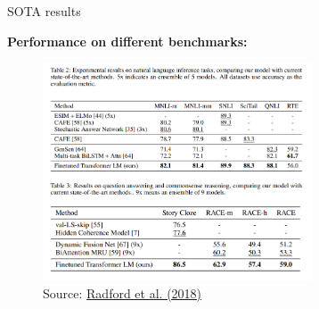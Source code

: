 
\begin{vbframe}{SOTA results}

\vfill

	\textbf{Performance on different benchmarks:}

	\begin{figure}
		\centering
		\includegraphics[width = 8cm]{figure/gpt-sota.png}\\ 
		\footnotesize{Source:} \href{https://s3-us-west-2.amazonaws.com/openai-assets/research-covers/language-unsupervised/language_understanding_paper.pdf}{\footnotesize Radford et al. (2018)}
	\end{figure}

\vfill

\end{vbframe}


\endlecture

